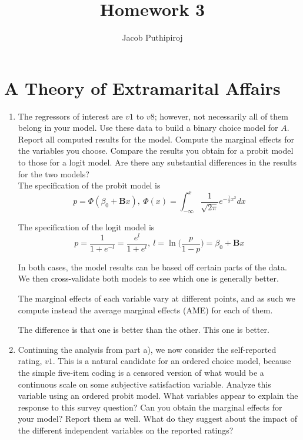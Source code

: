 \documentclass{article}
\begin{document}
\title{\vspace{-2.0cm}Homework 3}
\author{Jacob Puthipiroj}
\maketitle

\section{A Theory of Extramarital Affairs}

\begin{enumerate}[label=(\alph*)]
\item The regressors of interest are $v1$ to $v8$; however, not necessarily all of them belong in your model. Use these data to build a binary choice model for $A$. Report all computed results for the model. Compute the marginal effects for the variables you choose. Compare the results you obtain for a probit model to those for a logit model. Are there any substantial differences in the results for the two models?\\

The specification of the probit model is 
$$ p = \Phi(\beta_0 + \textbf{B}x), \ \Phi(x) = \int_{-\infty}^x \frac{1}{\sqrt{2 \pi } } e^{-\frac{1}{2}x^2} dx$$


The specification of the logit model is 
$$ p = \frac{1}{1+e^{-l}} = \frac{e^l}{1 + e^l}, \ l = \ln \Big( \frac{p}{1-p} \Big) = \beta_0 + \textbf{B}x$$

In both cases, the model results can be based off certain parts of the data. We then cross-validate both models to see which one is generally better.

The marginal effects of each variable vary at different points, and as such we compute instead the average marginal effects (AME) for each of them. 

The difference is that one is better than the other. This one is better. 


\item Continuing the analysis from part a), we now consider the self-reported rating, $v1$. This is a natural candidate for an ordered choice model, because the simple five-item coding is a censored version of what would be a continuous scale on some subjective satisfaction variable. Analyze this variable using an ordered probit model. What variables appear to explain the response to this survey question? Can you obtain the marginal effects for your model? Report them as well. What do they suggest about the impact of the different independent variables on the reported ratings?



\end{enumerate}
\end{document}
